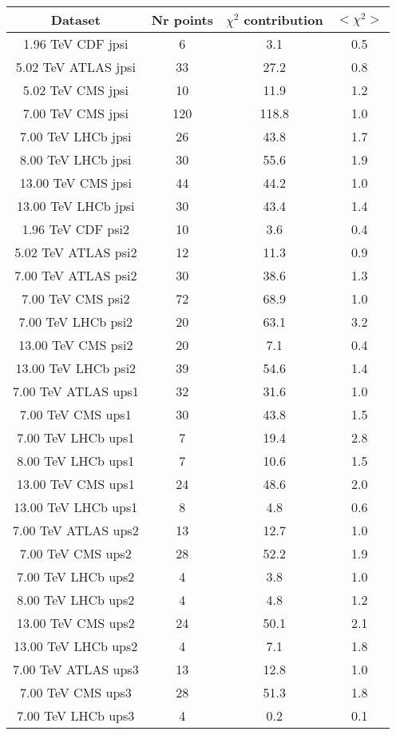 \begin{table}[h!]
\centering
\begin{tabular}{c|c|c|c}
Dataset & Nr points & $\chi^2$ contribution & $<\chi^2>$ \\
\hline
1.96 TeV CDF jpsi & 6 & 3.1 & 0.5 \\
5.02 TeV ATLAS jpsi & 33 & 27.2 & 0.8 \\
5.02 TeV CMS jpsi & 10 & 11.9 & 1.2 \\
7.00 TeV CMS jpsi & 120 & 118.8 & 1.0 \\
7.00 TeV LHCb jpsi & 26 & 43.8 & 1.7 \\
8.00 TeV LHCb jpsi & 30 & 55.6 & 1.9 \\
13.00 TeV CMS jpsi & 44 & 44.2 & 1.0 \\
13.00 TeV LHCb jpsi & 30 & 43.4 & 1.4 \\
1.96 TeV CDF psi2 & 10 & 3.6 & 0.4 \\
5.02 TeV ATLAS psi2 & 12 & 11.3 & 0.9 \\
7.00 TeV ATLAS psi2 & 30 & 38.6 & 1.3 \\
7.00 TeV CMS psi2 & 72 & 68.9 & 1.0 \\
7.00 TeV LHCb psi2 & 20 & 63.1 & 3.2 \\
13.00 TeV CMS psi2 & 20 & 7.1 & 0.4 \\
13.00 TeV LHCb psi2 & 39 & 54.6 & 1.4 \\
7.00 TeV ATLAS ups1 & 32 & 31.6 & 1.0 \\
7.00 TeV CMS ups1 & 30 & 43.8 & 1.5 \\
7.00 TeV LHCb ups1 & 7 & 19.4 & 2.8 \\
8.00 TeV LHCb ups1 & 7 & 10.6 & 1.5 \\
13.00 TeV CMS ups1 & 24 & 48.6 & 2.0 \\
13.00 TeV LHCb ups1 & 8 & 4.8 & 0.6 \\
7.00 TeV ATLAS ups2 & 13 & 12.7 & 1.0 \\
7.00 TeV CMS ups2 & 28 & 52.2 & 1.9 \\
7.00 TeV LHCb ups2 & 4 & 3.8 & 1.0 \\
8.00 TeV LHCb ups2 & 4 & 4.8 & 1.2 \\
13.00 TeV CMS ups2 & 24 & 50.1 & 2.1 \\
13.00 TeV LHCb ups2 & 4 & 7.1 & 1.8 \\
7.00 TeV ATLAS ups3 & 13 & 12.8 & 1.0 \\
7.00 TeV CMS ups3 & 28 & 51.3 & 1.8 \\
7.00 TeV LHCb ups3 & 4 & 0.2 & 0.1 \\

\end{tabular}
\end{table}
